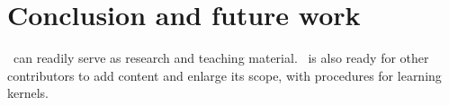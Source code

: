 \section{Conclusion and future work} %
\label{sec:conclusion_and_future_work}

	\DPPy\ can readily serve as research and teaching material.
  \DPPy\ is also ready for other contributors to add content and enlarge its scope, \eg with procedures for learning kernels.

